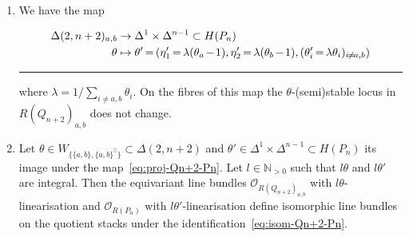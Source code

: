 \documentclass[ALCO,ThmDefs,Unicode,epreuves]{cedram}
\def\N{\mathds N}
\def\O{\mathcal O}
\newenvironment{equationi}{\par\noindent\vspace*{\abovedisplayskip}\begin{minipage}{\linewidth}
\begin{equation}}{\end{equation}\end{minipage}\hrule height0pt\leavevmode}
\newcommand*{\Mk}{\mkern -2mu}
\begin{document}
\begin{prop}
\begin{enumerate}[label=(\alph*)]
\item\label{prop2.7_b} %
We have the map
\begin{equationi}\label{eq:proj-Qn+2-Pn}
\begin{aligned}[t]
\Delta(2,n+2)_{a,b}&\to\Delta^1\times\Delta^{n-1}\subset H(P_n)\\
\theta&\mapsto\theta'\Mk =\Mk (\eta'_1\Mk =\Mk \lambda(\theta_a\Mk -\Mk 1),\eta'_2\Mk =\Mk \lambda(\theta_b\Mk -\Mk 1),
(\theta'_i\Mk =\Mk \lambda\theta_i)_{i\Mk \neq \Mk a,b})
\end{aligned}
\end{equationi}

\noindent
where $\lambda=1/\sum_{i\neq a,b}\theta_i$.
On the fibres of this map the $\theta$-(semi)stable locus in
$R(Q_{n+2})_{a,b}$ does not change. %

\item\label{prop2.7_c}
Let $\theta\in W_{\{\{a,b\},\{a,b\}^\complement\}}\subset\Delta(2,n+2)$ and 
$\theta'\in\Delta^1\times\Delta^{n-1}\subset H(P_n)$ its image under the
map~\eqref{eq:proj-Qn+2-Pn}.
Let $l\in\N_{>0}$ such that $l\theta$ and $l\theta'$ are integral. Then
the equivariant line bundles $\O_{R(Q_{n+2})_{a,b}}$ with $l\theta$-linearisation 
and $\O_{R(P_n)}$ with $l\theta'$-linearisation define isomorphic line bundles 
on the quotient stacks under the identification~\eqref{eq:isom-Qn+2-Pn}.
\end{enumerate}
\end{prop}
\end{document}
